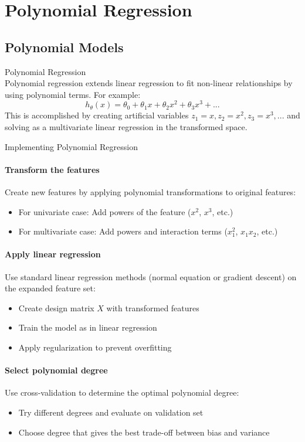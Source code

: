 \section{Polynomial Regression}

\subsection{Polynomial Models}

\begin{definition}{Polynomial Regression}\\
Polynomial regression extends linear regression to fit non-linear relationships by using polynomial terms. For example:
\[h_\theta(x) = \theta_0 + \theta_1 x + \theta_2 x^2 + \theta_3 x^3 + ...\]
This is accomplished by creating artificial variables $z_1 = x, z_2 = x^2, z_3 = x^3,...$ and solving as a multivariate linear regression in the transformed space.
\end{definition}

\begin{KR}{Implementing Polynomial Regression}
\paragraph{Transform the features}
Create new features by applying polynomial transformations to original features:
\begin{itemize}
    \item For univariate case: Add powers of the feature ($x^2$, $x^3$, etc.)
    \item For multivariate case: Add powers and interaction terms ($x_1^2$, $x_1x_2$, etc.)
\end{itemize}

\paragraph{Apply linear regression}
Use standard linear regression methods (normal equation or gradient descent) on the expanded feature set:
\begin{itemize}
    \item Create design matrix $X$ with transformed features
    \item Train the model as in linear regression
    \item Apply regularization to prevent overfitting
\end{itemize}

\paragraph{Select polynomial degree}
Use cross-validation to determine the optimal polynomial degree:
\begin{itemize}
    \item Try different degrees and evaluate on validation set
    \item Choose degree that gives the best trade-off between bias and variance
\end{itemize}
\end{KR}

